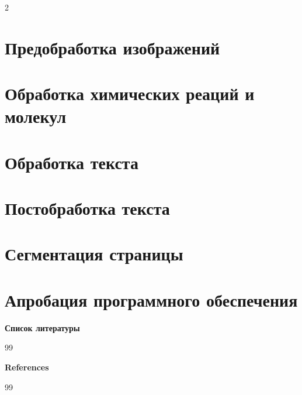 \documentclass[11pt]{article}
\begin{document}
\begin{multicols}{2}


\section{Предобработка изображений}






\section{Обработка химических реаций и молекул}


\section{Обработка текста}


\section{Постобработка текста}


\section{Сегментация страницы}


\section{Апробация программного обеспечения}
% 









% 

\end{multicols}
\begin{center}
	\textbf{Список литературы}
\end{center}
\begin{thebibliography}{99}
	\small
	
\end{thebibliography}

\begin{center}
	\textbf{References}
\end{center}
\begin{thebibliography}{99}
	\small
	
\end{thebibliography}

	
\end{document}
